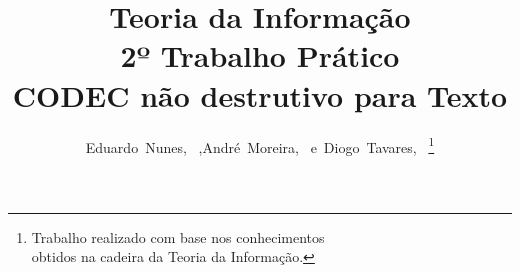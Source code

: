 \documentclass[10pt,journal,compsoc]{IEEEtran}
\begin{document}
    \graphicspath{ {./images/} }
    
    \title{Teoria da Informação\\2º Trabalho Prático\\CODEC não destrutivo para Texto}
    
    \author{Eduardo~Nunes,~
             ,André~Moreira,~
            e~Diogo~Tavares,~%
    \thanks{Trabalho realizado com base nos conhecimentos\\ obtidos na cadeira da Teoria da Informação.}}
    
\end{document}

